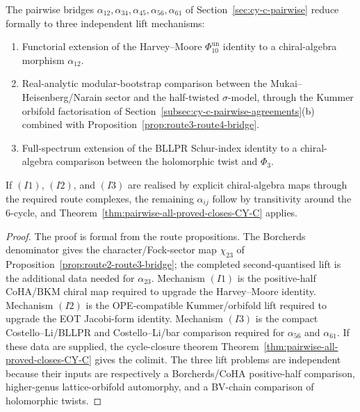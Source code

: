 \begin{corollary}
\label{cor:cy-c-three-identities-reduction}
The pairwise bridges $\alpha_{12}, \alpha_{34}, \alpha_{45}, \alpha_{56}, \alpha_{61}$ of Section~\ref{sec:cy-c-pairwise} reduce formally to three independent lift mechanisms:
\begin{enumerate}[label=\textup{(I\arabic*)}]
 \item Functorial extension of the Harvey--Moore \(\Phi_{10}^{\mathrm{un}}\)
 identity to a chiral-algebra morphism $\alpha_{12}$.
 \item Real-analytic modular-bootstrap comparison between the Mukai--Heisenberg/Narain sector and the half-twisted $\sigma$-model, through the Kummer orbifold factorisation of Section~\ref{subsec:cy-c-pairwise-agreements}(b) combined with Proposition~\ref{prop:route3-route4-bridge}.
 \item Full-spectrum extension of the BLLPR Schur-index identity to a chiral-algebra comparison between the holomorphic twist and $\Phi_3$.
\end{enumerate}
If $(I1)$, $(I2)$, and $(I3)$ are realised by explicit
chiral-algebra maps through the required route complexes, the remaining
$\alpha_{ij}$ follow by transitivity around the $6$-cycle, and
Theorem~\ref{thm:pairwise-all-proved-closes-CY-C} applies.
\end{corollary}

\begin{proof}
The proof is formal from the route propositions. The Borcherds
denominator gives the character/Fock-sector map $\chi_{23}$ of
Proposition~\ref{prop:route2-route3-bridge}; the completed
second-quantised lift is the additional data needed for $\alpha_{23}$.
Mechanism $(I1)$ is the positive-half CoHA/BKM chiral map required to
upgrade the Harvey--Moore identity. Mechanism $(I2)$ is the
OPE-compatible Kummer/orbifold lift required to upgrade the EOT
Jacobi-form identity. Mechanism $(I3)$ is the compact
Costello--Li/BLLPR and Costello--Li/bar comparison required for
$\alpha_{56}$ and $\alpha_{61}$. If these data are supplied, the
cycle-closure theorem Theorem~\ref{thm:pairwise-all-proved-closes-CY-C}
gives the colimit. The three lift problems are independent because their
inputs are respectively a Borcherds/CoHA positive-half comparison,
higher-genus lattice-orbifold automorphy, and a BV-chain comparison of
holomorphic twists.
\end{proof}

